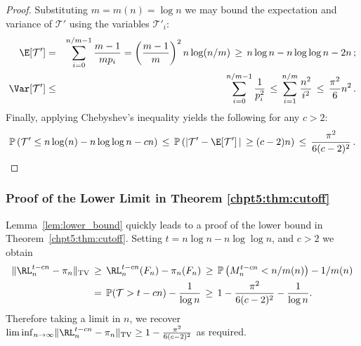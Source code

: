 \documentclass[11pt]{report}
\begin{document}
\begin{proof}
	Substituting $m = m(n)=\log n$ we may bound the expectation and variance of 
	$\mathcal T'$ using the variables $\mathcal T'_{i}$:
	\begin{eqnarray*}
		\E[\mathcal{T}^{\prime}] & = & 
		\sum_{i=0}^{n/m-1} 
		\frac{m-1}{mp_i} =  \left(\frac{m-1}{m}\right)^{2} 
		n\log(n/m)\,\geq\, n\log n  
		-n\log \log n -2n \,;\\
		\Var[\mathcal{T}^{\prime}] & \le & \sum_{i=0}^{n/m-1}  
		\frac{1}{p_i^2} \,\le\, 
		\sum_{i=1}^{n/m}\frac{n^{2}}{i^{2}} 
		\,\leq\, 	\frac{\pi^{2}}{6}n^{2}\,.
	\end{eqnarray*}
	Finally, applying Chebyshev's inequality yields the following for any 
	$c>2$:
	\[	\mathbb{P}\left(\mathcal{T}^{\prime} \leq n\log(n) - n \log \log n 
	-cn\right) 
	\,\leq\, 
	\mathbb{P}\left(|\mathcal{T}^{\prime} -\E[\mathcal{T}^{\prime}]\,|\, \geq  
	(c-2)n \right)
	\,\leq\,  \frac{\pi^2}{6(c-2)^2}\,.  \qedhere		\]
	
	
	
	
	
	
	
	
	
	
	
	
	
	
	
	
	
	
	
	
	
	
	
\end{proof}

























\subsubsection{Proof of the Lower Limit in Theorem \ref{chpt5:thm:cutoff}}	
Lemma~\ref{lem:lower_bound} 
quickly leads to a proof of the lower bound in Theorem~\ref{chpt5:thm:cutoff}. Setting $t = n\log n - n \log \log n $, and $c>2$ we obtain
\begin{align*}
\lVert \RL_n^{t-cn} -\pi_n \rVert_{\tiny \textnormal{TV}}\, &\ge\, 
\RL_n^{t-cn}(F_n) - \pi_n(F_n) 
\,\ge\, \mathbb{P}\left(M^{t-cn}_{n} < n/m(n)\right)- 1/m(n)\\
&= \, \mathbb{P}(\mathcal{T} >t-cn) - \frac{1}{\log n } 
\,\ge\,  1 -\frac{\pi^{2}}{6(c-2)^2} - \frac{1}{\log n }.
\end{align*}
Therefore taking a limit in $n$, we recover $\liminf_{n\to\infty} \lVert \RL_n^{t-cn} -\pi_n \rVert_{\textnormal{TV}} \geq 1 - \frac{\pi^{2}}{6(c-2)^{2}}$ as required.
\end{document}

